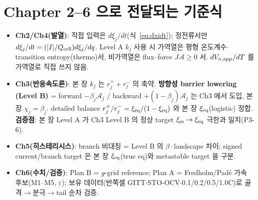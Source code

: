 \section{Chapter 2--6 으로 전달되는 기준식}\label{sec:transmit}
\begin{itemize}[leftmargin=1.4em]
\item \textbf{Ch2/Ch4(발열)}: 직접 입력은 $d\xi_j/dt$(식~\eqref{eq:dxidt}); 정전류서만
  $d\xi_j/dt=(|I|/Q_{\mathrm{cell}})d\xi_j/dq$. Level A $k_j$ 사용 시 가역열은 평형 온도계수$\cdot$transition
  entropy(thermo)서, 비가역열은 flux--force $J\mathcal A\ge0$ 서. $dV_{n,\mathrm{app}}/dT$ 를 가역열로 직접 쓰지 않음.
\item \textbf{Ch3(반응속도론)}: 본 장 $k_j$ 는 $r_j^++r_j^-$ 의 축약. \textbf{방향성 barrier lowering
  (Level B)} = forward $-\beta_j\mathcal A_j$ / backward $+(1-\beta_j)\mathcal A_j$ 는 Ch3 에서 도입,
  본 장 $\chi_j=\beta_j$. detailed balance $r_j^+/r_j^-=\xi_{\mathrm{eq}}/(1-\xi_{\mathrm{eq}})$ 와 본 장 $\xi_{\mathrm{eq}}$(logistic)
  정합. \textbf{검증점}: 본 장 Level A 가 Ch3 Level B 의 정상 target $\xi_\mathrm{ss}\to\xi_{\mathrm{eq}}$ 극한과
  일치(P3-6).
\item \textbf{Ch5(히스테리시스)}: branch 비대칭 = Level B 의 $\beta\cdot$landscape 차이; signed
  current/branch target 은 본 장 $\xi_{\mathrm{eq}}$(true eq)와 metastable target 을 구분.
\item \textbf{Ch6(수치/검증)}: Plan B = $g$-grid reference; Plan A = Fredholm/Pad\'e 가속 후보(M1--M5,
  $\varepsilon$); 보유 데이터(반쪽셀 GITT$\cdot$STO-OCV$\cdot$0.1/0.2/0.5/1.0C)로 골격$\to$분극$\to$tail
  순차 검증.
\end{itemize}

